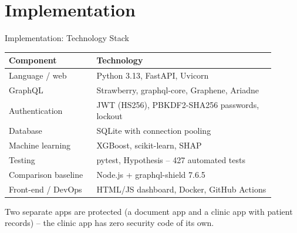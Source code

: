 \documentclass[aspectratio=169,11pt]{beamer}
\begin{document}
\section{Implementation}
\begin{frame}{Implementation: Technology Stack}
\begin{center}
\small
\renewcommand{\arraystretch}{1.12}
\begin{tabular}{>{\raggedright\arraybackslash}p{0.299\linewidth}>{\raggedright\arraybackslash}p{0.599\linewidth}}
\toprule
\textbf{Component} & \textbf{Technology} \\
\midrule
Language / web & Python 3.13, FastAPI, Uvicorn \\
\rowcolor{rowgrey}GraphQL & Strawberry, graphql-core, Graphene, Ariadne \\
Authentication & JWT (HS256), PBKDF2-SHA256 passwords, lockout \\
\rowcolor{rowgrey}Database & SQLite with connection pooling \\
Machine learning & XGBoost, scikit-learn, SHAP \\
\rowcolor{rowgrey}Testing & pytest, Hypothesis – 427 automated tests \\
Comparison baseline & Node.js + graphql-shield 7.6.5 \\
\rowcolor{rowgrey}Front-end / DevOps & HTML/JS dashboard, Docker, GitHub Actions \\
\bottomrule
\end{tabular}
\end{center}
\vfill
\begin{simplebox}Two separate apps are protected (a document app and a clinic app with patient records) – the clinic app has zero security code of its own.\end{simplebox}
\end{frame}
\end{document}
